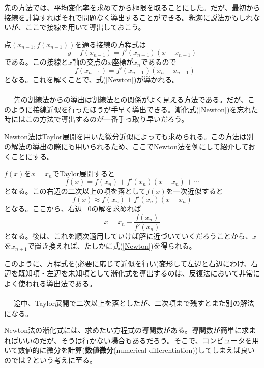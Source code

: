 先の方法では、平均変化率を求めてから極限を取ることにした。だが、最初から接線を計算すればそれで問題なく導出することができる。釈迦に説法かもしれないが、ここで接線を用いて導出しておこう。

点$(x_{n-1},f(x_{n-1}))$を通る接線の方程式は
\begin{equation}
y-f(x_{n-1})=f'(x_{n-1})(x-x_{n-1})
\end{equation}
である。この接線と$x$軸の交点の$x$座標が$x_n$であるので
\begin{equation}
-f(x_{n-1})=f'(x_{n-1})(x_n-x_{n-1})
\end{equation}
となる。これを解くことで、式(\ref{Newton})が導かれる。
\\ \\　
先の割線法からの導出は割線法との関係がよく見える方法である。だが、このように接線近似を行ったほうが手早く導出できる。漸化式(\ref{Newton})を忘れた時にはこの方法で導出するのが一番手っ取り早いだろう。

Newton法はTaylor展開を用いた微分近似によっても求められる。この方法は別の解法の導出の際にも用いられるため、ここでNewton法を例にして紹介しておくことにする。

$f(x)$を$x=x_n$でTaylor展開すると
\begin{equation}
f(x)=f(x_n)+f'(x_n)(x-x_n)+\cdots
\end{equation}
となる。この右辺の二次以上の項を落として$f(x)$を一次近似すると
\begin{equation}
f(x)\approx f(x_n)+f'(x_n)(x-x_n)
\end{equation}
となる。ここから、右辺=0の解を求めれば
\begin{equation}
x=x_n-\frac{f(x_{n})}{f'(x_{n})}
\end{equation}
となる。後は、これを順次適用していけば解に近づいていくだろうことから、$x$を$x_{n+1}$で置き換えれば、たしかに式(\ref{Newton})を得られる。

このように、方程式を(必要に応じて近似を行い)変形して左辺と右辺にわけ、右辺を既知項・左辺を未知項として漸化式を導出するのは、反復法において非常によく使われる導出法である。
\\ \\　
途中、Taylor展開で二次以上を落としたが、二次項まで残すとまた別の解法になる。

Newton法の漸化式には、求めたい方程式の導関数がある。導関数が簡単に求まればいいのだが、そうは行かない場合もあるだろう。そこで、コンピュータを用いて数値的に微分を計算(\textbf{数値微分}(numerical differentiation))してしまえば良いのでは？という考えに至る。

